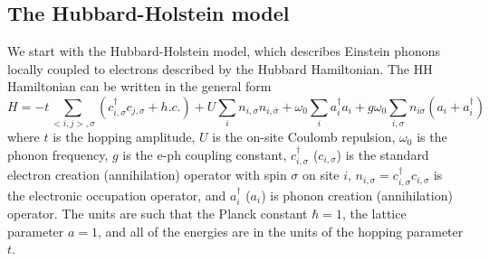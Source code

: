 \documentclass[article,11pt]{revtex4}
\begin{document}
\subsection {The Hubbard-Holstein model}
We start with the
Hubbard-Holstein model, which describes Einstein phonons
locally coupled to electrons described by the Hubbard
Hamiltonian. The HH Hamiltonian can be written in the general form
\begin{equation}
 \label{HH}
H=-t \sum\limits_{<i,j>, \sigma}(c^\dagger_{i,\sigma}
c_{j,\sigma} + h.c.) + U \sum\limits_{i} n_{i,\sigma}
n_{i,\bar{\sigma}} + \omega_0 \sum\limits_i a^\dagger_i a_i + g \omega_0
\sum\limits_{i, \sigma} n_{i\sigma} (a_i+a^\dagger_i)
\end{equation}
where $t$ is the hopping amplitude, $U$ is the on-site Coulomb repulsion, $\omega_0$ is the phonon frequency, $g$ is the e-ph coupling constant, $c^\dagger_{i,\sigma}$ ($c_{i,\sigma}$) is the standard electron creation
(annihilation) operator with spin ${\sigma}$ on site $i$, $n_{i,\sigma}=c^\dagger_{i,\sigma} c_{i,\sigma}$ is the electronic occupation operator,
and $a^\dagger_i$ ($a_i$) is phonon creation
(annihilation) operator. The units are such that the Planck constant $\hbar=1$, the lattice parameter $a=1$, and all of the energies are in the units of the hopping parameter $t$.  
\end{document}
